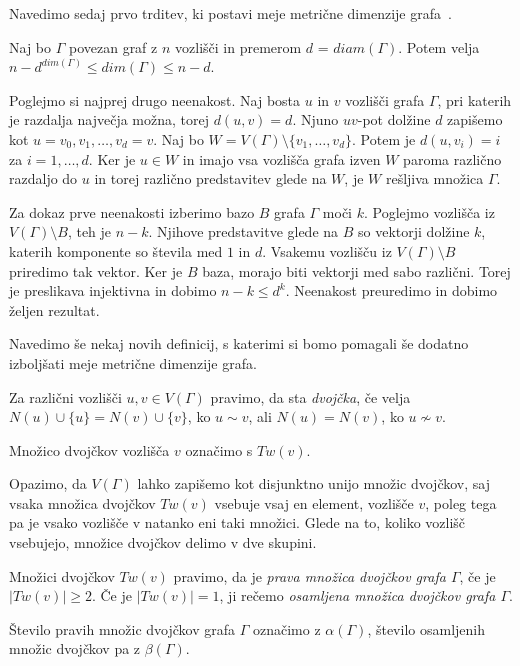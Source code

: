 \documentclass[mat1, tisk]{fmfdelo}
\begin{document}
Navedimo sedaj prvo trditev, ki postavi meje metrične dimenzije grafa~\cite{10chartrand}.
%
\begin{trditev}
  Naj bo $\Gamma$ povezan graf z $n$ vozlišči in premerom $d$ = $diam(\Gamma)$. Potem velja
  $n - d^{dim(\Gamma)} \leq dim(\Gamma) \leq n - d$.
\end{trditev}
\begin{dokaz}
  Poglejmo si najprej drugo neenakost. Naj bosta $u$ in $v$ vozlišči grafa 
  $\Gamma$, pri katerih je razdalja največja možna, torej $d(u,v) = d$. 
  Njuno $uv$-pot dolžine $d$ zapišemo kot $u=v_0, v_1, \ldots, v_d=v$. 
  Naj bo $W = V(\Gamma) \setminus \{v_1, \ldots, v_d \}$. Potem je 
  $d(u,v_i) = i$ za $i = 1, \ldots, d$. Ker je $u \in W$ in imajo 
  vsa vozlišča grafa izven $W$ paroma različno razdaljo do $u$ in 
  torej različno predstavitev glede na $W$, je $W$ 
  rešljiva množica $\Gamma$.

  Za dokaz prve neenakosti izberimo bazo $B$ grafa $\Gamma$ moči $k$. 
  Poglejmo vozlišča iz $V(\Gamma) \setminus B$, teh je $n-k$. 
  Njihove predstavitve 
  glede na $B$ so vektorji dolžine $k$, katerih komponente so števila med 
  $1$ in $d$. Vsakemu vozlišču iz $V(\Gamma) \setminus B$ priredimo 
  tak vektor. Ker je $B$ baza, morajo biti vektorji med sabo različni. 
  Torej je preslikava injektivna in dobimo $n - k \leq d^k$. 
  Neenakost preuredimo in dobimo željen rezultat.
\end{dokaz}
%
Navedimo še nekaj novih definicij, s katerimi si bomo pomagali še dodatno 
izboljšati meje metrične dimenzije grafa.
%
\begin{definicija}
  Za različni vozlišči $u, v\in V(\Gamma)$ pravimo, da sta \emph{dvojčka}, če velja 
  $N(u) \cup \{u\} = N(v) \cup \{v\} $, ko $u \sim v$, ali 
  $N(u) = N(v) $, ko $u \nsim v$.

  Množico dvojčkov vozlišča $v$ označimo s $Tw(v)$.
\end{definicija}
%
Opazimo, da $V(\Gamma)$ lahko zapišemo kot disjunktno unijo množic 
dvojčkov, saj vsaka množica dvojčkov $Tw(v)$ vsebuje vsaj en element, vozlišče $v$, 
poleg tega pa je vsako vozlišče v natanko eni taki množici.
Glede na to, koliko vozlišč vsebujejo, množice dvojčkov delimo v dve skupini.
%
\begin{definicija}
  Množici dvojčkov $Tw(v)$ pravimo, da je \emph{prava množica dvojčkov grafa $\Gamma$}, 
  če je $|Tw(v)| \geq 2$. Če je $|Tw(v)| = 1$, ji rečemo 
  \emph{osamljena množica dvojčkov grafa $\Gamma$}. 

  Število pravih množic dvojčkov grafa $\Gamma$ označimo z \emph{$\alpha(\Gamma)$}, število 
  osamljenih množic dvojčkov pa z \emph{$\beta(\Gamma)$}.
\end{definicija}
\end{document}
